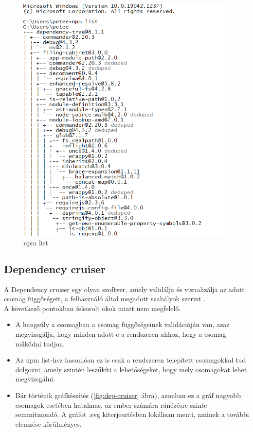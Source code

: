 	\begin{figure}[h]
		\centering
		\includegraphics[scale=0.35]{images/npm_ls.png}
		\caption{npm list}
		\label{fig:npm-ls}
	\end{figure}
	
	\subsection{Dependency cruiser}
	
	A Dependency cruiser egy olyan szoftver, amely validálja és vizualizálja az adott csomag függőségeit, a felhasználó által megadott szabályok szerint \cite{dep-cruise}.\\
	
	A következő pontokban felsorolt okok miatt nem megfelelő.
	\begin{itemize}
		\item A hangsúly a csomagban a csomag függőségeinek validációján van, azaz megvizsgálja, hogy minden adott-e a rendszeren ahhoz, hogy a csomag működni tudjon.
		\item Az npm list-hez hasonlóan ez is csak a rendszeren telepített csomagokkal tud dolgozni, amely szintén leszűkíti a lehetőségeket, hogy mely csomagokat lehet megvizsgálni.
		\item Bár történik gráfkészítés (\ref{fig:dep-cruiser} ábra), azonban ez a gráf nagyobb csomagok esetében hatalmas, az ember számára ránézésre szinte semmitmondó. A gráfot .svg kiterjesztésben lokálisan menti, aminek a további elemzése körülményes.
	\end{itemize}
		
